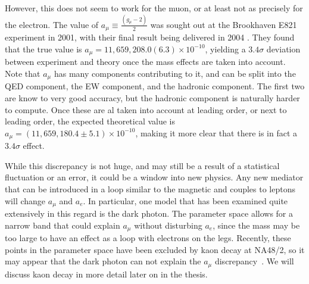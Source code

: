 However, this does not seem to work for the muon, or at least not as precisely for the electron.
The value of $a_\mu \equiv \frac{(g_\mu-2)}{2}$ was sought out at the Brookhaven E821 experiment in 2001, with their final result being delivered in 2004 \cite{Hagiwara:2006jt}.
They found that the true value is $a_\mu = 11,659,208.0(6.3)\times 10^{-10}$, yielding a $3.4\sigma$ deviation between experiment and theory once the mass effects are taken into account.
Note that $a_\mu$ has many components contributing to it, and can be split into the QED component, the EW component, and the hadronic component.
The first two are know to very good accuracy, but the hadronic component is naturally harder to compute.
Once these are al taken into account at leading order, or next to leading order, the expected theoretical value is $a_\mu = (11,659,180.4 \pm 5.1)\times 10^{-10}$, making it more clear that there is in fact a $3.4\sigma$ effect.

While this discrepancy is not huge, and may still be a result of a statistical fluctuation or an error, it could be a window into new physics.
Any new mediator that can be introduced in a loop similar to the magnetic and couples to leptons will change $a_\mu$ and $a_e$.
In particular, one model that has been examined quite extensively in this regard is the dark photon.
The parameter space allows for a narrow band that could explain $a_\mu$ without disturbing $a_e$, since the mass may be too large to have an effect as a loop with electrons on the legs.
Recently, these points in the parameter space have been excluded by kaon decay at NA48/2, so it may appear that the dark photon can not explain the $a_\mu$ discrepancy~\cite{Batley:2015lha}.
We will discuss kaon decay in more detail later on in the thesis.
